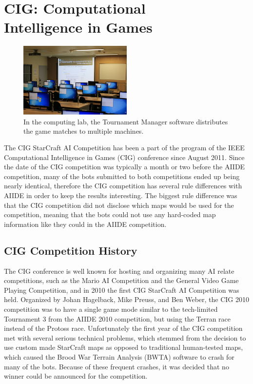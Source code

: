 \section{CIG: Computational\\ Intelligence in Games}\label{subsecCIG}

\begin{figure}[t]
  \centering
  \includegraphics[width=0.5\textwidth]{fig/cig-starcraft-runs.png}
  \caption{In the computing lab, the Tournament Manager software distributes the game matches to multiple machines.}
  \label{figCIGruns}
\end{figure}

The CIG StarCraft AI Competition has been a part of the program of the IEEE Computational Intelligence in Games (CIG) conference since August 2011.  Since the date of the CIG competition was typically a month or two before the AIIDE competition, many of the bots submitted to both competitions ended up being nearly identical, therefore the CIG competition has several rule differences with AIIDE in order to keep the results interesting. The biggest rule difference was that the CIG competition did not disclose which maps would be used for the competition, meaning that the bots could not use any hard-coded map information like they could in the AIIDE competition.

\subsection{CIG Competition History}
The CIG conference is well known for hosting and organizing many AI relate competitions, such as the Mario AI Competition and the General Video Game Playing Competition, and in 2010 the first CIG StarCraft AI Competition was held. Organized by Johan Hagelback, Mike Preuss, and Ben Weber, the CIG 2010 competition was to have a single game mode similar to the tech-limited Tournament 3 from the AIIDE 2010 competition, but using the Terran race instead of the Protoss race. Unfortunately the first year of the CIG competition met with several serious technical problems, which stemmed from the decision to use custom made StarCraft maps as opposed to traditional human-tested maps, which caused the Brood War Terrain Analysis (BWTA) software to crash for many of the bots. Because of these frequent crashes, it was decided that no winner could be announced for the competition. 

